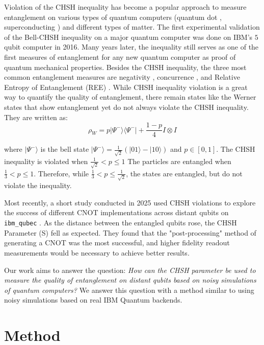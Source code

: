 \documentclass[a4paper, onecolumn, 11pt, titlepage]{quantumarticle}
\begin{document}
Violation of the CHSH inequality has become a popular approach to measure entanglement on various types of quantum computers (quantum dot \cite{steinacker2025bell}, superconducting \cite{storz2023loophole}) and different types of matter. The first experimental validation of the Bell-CHSH inequality on a major quantum computer was done on IBM’s $5$ qubit computer in 2016. Many years later, the inequality still serves as one of the first measures of entanglement for any new quantum computer as proof of quantum mechanical properties. Besides the CHSH inequality, the three most common entanglement measures are negativity \cite{PhysRevA.65.032314}, concurrence \cite{PhysRevLett.80.2245}, and Relative Entropy of Entanglement (REE) \cite{PhysRevLett.78.2275}. While CHSH inequality violation is a great way to quantify the quality of entanglement, there remain states like the Werner states that show entanglement yet do not always violate the CHSH inequality. They are written as:
$$\rho_W = p|\Psi^-\rangle \langle\Psi^-| + \frac{1 - p}{4}I \otimes I$$

where $|\Psi^-\rangle$ is the bell state $|\Psi^-\rangle = \frac{1}{\sqrt{2}} (|01\rangle - |10\rangle)$ and $p \in [0,1]$. 
 The CHSH inequality is violated when 
$\frac{1}{\sqrt{2}} < p \leq 1$
The particles are entangled when 
$\frac{1}{3} < p \leq 1$.
Therefore, while $\frac{1}{3} < p \leq \frac{1}{\sqrt{2}}$, the states are entangled, but do not violate the inequality. 


Most recently, a short study conducted in 2025 used CHSH violations to explore the success of different CNOT implementations across distant qubits on \verb|ibm_qubec| \cite{waring2025chshviolationsusingdynamic}. As the distance between the entangled qubits rose, the CHSH Parameter (S) fell as expected. They found that the "post-processing" method of generating a CNOT was the most successful, and higher fidelity readout measurements would be necessary to achieve better results.

Our work aims to answer the question: \textit{How can the CHSH parameter be used to measure the quality of entanglement on distant qubits based on noisy simulations of quantum computers?} We answer this question with a method similar to \cite{waring2025chshviolationsusingdynamic} using noisy simulations based on real IBM Quantum backends.

\section{Method}
\end{document}

